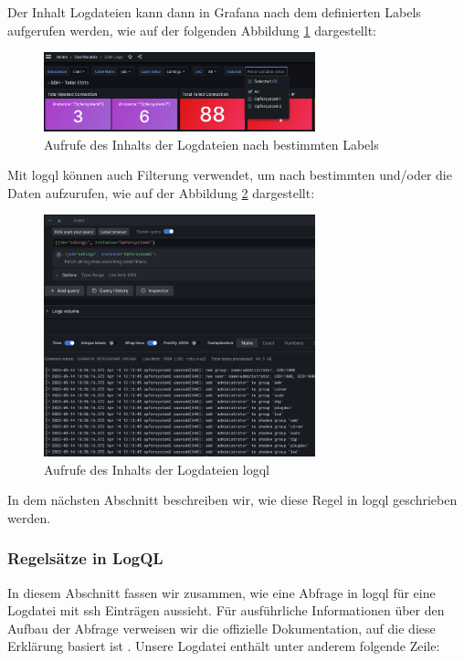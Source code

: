 \newpage
Der Inhalt Logdateien kann dann in Grafana nach dem definierten Labels aufgerufen werden, wie auf der folgenden Abbildung \ref{fig:screenshot_labels} dargestellt:

\begin{figure}[H]
   \centering
   \includegraphics[width=0.7\textwidth]{assets/Grafana_labels.png}
   \caption[Aufrufe des Inhalts der Logdateien nach bestimmten Labels]
   {Aufrufe des Inhalts der Logdateien nach bestimmten Labels}
   \label{fig:screenshot_labels}
   \centering
\end{figure}

Mit \gls{logql} können auch Filterung verwendet, um nach bestimmten  und/oder  die Daten aufzurufen, wie auf der Abbildung \ref{fig:screenshot_logql} dargestellt:

\begin{figure}[H]
   \centering
   \includegraphics[width=0.7\textwidth]{assets/Logql_labels.png}
   \caption[Aufrufe des Inhalts der Logdateien mit \gls{logql}]
   {Aufrufe des Inhalts der Logdateien \gls{logql}}
   \label{fig:screenshot_logql}
   \centering
\end{figure}

In dem nächsten Abschnitt beschreiben wir, wie diese Regel in \gls{logql} geschrieben werden.

\newpage
\subsubsection{Regelsätze in LogQL}
In diesem Abschnitt fassen wir zusammen, wie eine Abfrage in \gls{logql} für eine Logdatei mit \gls{ssh} Einträgen aussieht. Für ausführliche Informationen über den Aufbau der Abfrage verweisen wir die offizielle Dokumentation, auf die diese Erklärung basiert ist \citep{Grafana_logql}. Unsere Logdatei enthält unter anderem folgende Zeile:

